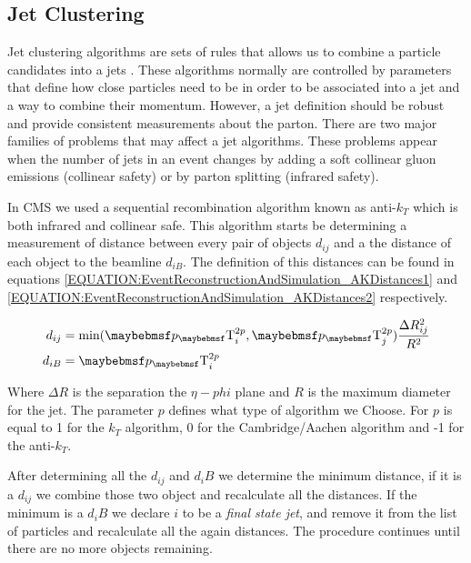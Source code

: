 \subsection{Jet Clustering}
\label{SECTION:EventReconstructionAndSimulation_Jets_JetClustering}


Jet clustering algorithms are sets of rules that allows us to combine a particle candidates into a jets \cite{ARTICLE:TowardsJetography}. These algorithms normally are controlled by parameters that define how close particles need to be in order to be associated into a jet and a way to combine their momentum. However, a jet definition should be robust and provide consistent measurements about the parton. There are two major families of problems that may affect a jet algorithms. These problems appear when the number of jets in an event changes by adding a soft collinear gluon emissions (collinear safety) or by parton splitting (infrared safety). 

In \gls{CMS} we used a sequential recombination algorithm known as anti-$k_T$ \cite{ARTICLE:AntiKtAlgorithm} which is both infrared and collinear safe. This algorithm starts be determining a measurement of distance between every pair of objects $d_{ij}$ and a the distance of each object to the beamline $d_{iB}$. The definition of this distances can be found in equations \ref{EQUATION:EventReconstructionAndSimulation_AKDistances1} and \ref{EQUATION:EventReconstructionAndSimulation_AKDistances2} respectively. 

\begin{align}
d_{ij} &= \text{min}({\pT}_{i}^{2p},{\pT}_{j}^{2p})\frac{\Delta R_{ij}^{2}}{R^{2}} \label{EQUATION:EventReconstructionAndSimulation_AKDistances1} \\
d_{iB} &= {\pT}_{i}^{2p}\ \label{EQUATION:EventReconstructionAndSimulation_AKDistances2} 
\end{align}

Where $\Delta R$ is the separation the $\eta-phi$ plane and $R$ is the maximum diameter for the jet. The parameter $p$ defines what type of algorithm we Choose. For $p$ is equal to 1 for the $k_T$ algorithm, 0 for the Cambridge/Aachen algorithm and -1 for the anti-$k_T$. 

After determining all the $d_{ij}$ and $d_iB$ we determine the minimum distance, if it is a $d_{ij}$ we combine those two object and recalculate all the distances. If the minimum is a $d_iB$ we declare $i$ to be a \textit{final state jet}, and remove it from the list of particles and recalculate all the again distances. The procedure continues until there are no more objects remaining.

